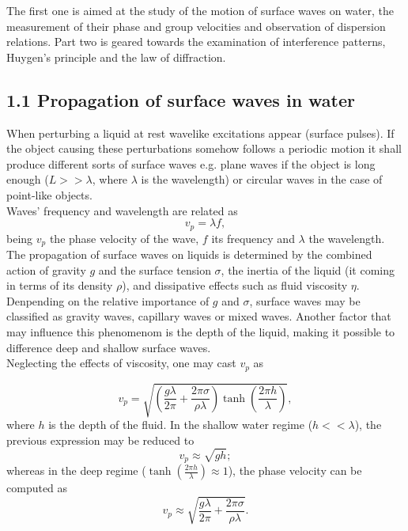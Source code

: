 \documentclass[a4paper, 12pt]{article}
\begin{document}
	The first one is aimed at the study of the motion of surface waves on water, the measurement of their phase and group velocities and observation of dispersion relations. Part two is geared towards the examination of interference patterns, Huygen's principle and the law of diffraction.
	\subsection{1.1 Propagation of surface waves in water}
	When perturbing a liquid at rest wavelike excitations appear (surface pulses). If the object causing these perturbations somehow follows a periodic motion it shall produce different sorts of surface waves e.g. plane waves if the object is long enough ($L >> \lambda$, where $\lambda$ is the wavelength) or circular waves in the case of point-like objects. \\
	
	Waves' frequency and wavelength are related as
	\begin{equation}\label{vp}
		v_p = \lambda f,
	\end{equation}
	being $v_p$ the phase velocity of the wave, $f$ its frequency and $\lambda$ the wavelength. \\
	
	The propagation of surface waves on liquids is determined by the combined action of gravity $g$ and the surface tension $\sigma$, the inertia of the liquid (it coming in terms of its density $\rho$), and dissipative effects such as fluid viscosity $\eta$. Denpending on the relative importance of $g$ and $\sigma$, surface waves may be classified as gravity waves, capillary waves or mixed waves. Another factor that may influence this phenomenom is the depth of the liquid, making it possible to difference deep and shallow surface waves.\\
	
	Neglecting the effects of viscosity, one may cast $v_p$ as
	
	\begin{equation}\label{vpw}
		v_p = \sqrt{\left(\frac{g\lambda}{2\pi} + \frac{2\pi\sigma}{\rho\lambda}\right)\tanh\left(\frac{2\pi h}{\lambda}\right)},
	\end{equation}
	where $h$ is the depth of the fluid. In the shallow water regime ($h << \lambda$), the previous expression may be reduced to 
	\begin{equation}\label{vpshallow}
		v_p \approx \sqrt{gh};
	\end{equation}
	whereas in the deep regime ($\tanh \left(\frac{2\pi h}{\lambda}\right) \approx 1$), the phase velocity can be computed as
	\begin{equation}\label{vpdeep}
		v_p \approx \sqrt{\frac{g\lambda}{2\pi} + \frac{2\pi\sigma}{\rho\lambda}}.
	\end{equation}
\end{document}
